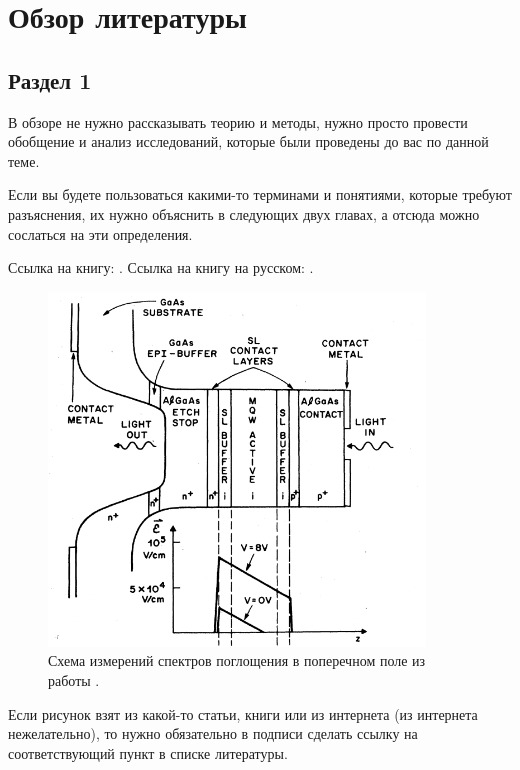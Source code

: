 \documentclass[a4paper,14pt]{extarticle}
\begin{document}
\pagebreak
\section{Обзор литературы}

\subsection{Раздел 1}

В обзоре не нужно рассказывать теорию и методы, нужно просто провести обобщение и анализ исследований, которые были проведены до вас по данной теме.

Если вы будете пользоваться какими-то терминами и понятиями, которые требуют разъяснения, их нужно объяснить в следующих двух главах, а отсюда можно сослаться на эти определения.

Ссылка на книгу: \cite{datta1}.
Ссылка на книгу на русском: \cite{fedotkin1}.

\begin{figure}[ht]
\begin{center}
\includegraphics[width=10cm]{images/Miller2-Figure2.png}

\caption{\label{fig:miller2-2}
    Схема измерений спектров поглощения в поперечном поле из работы \cite{miller1}.}
\end {center}
\end {figure}

Если рисунок взят из какой-то статьи, книги или из интернета (из интернета нежелательно), то нужно обязательно в подписи сделать ссылку на соответствующий пункт в списке литературы.
\end{document}
